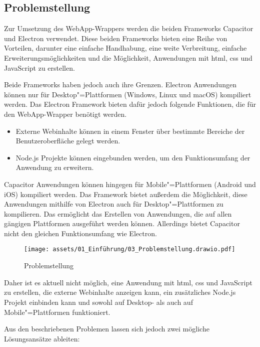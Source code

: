\subsection{Problemstellung}

Zur Umsetzung des WebApp-Wrappers werden die beiden Frameworks Capacitor und Electron verwendet.
Diese beiden Frameworks bieten eine Reihe von Vorteilen, darunter eine einfache Handhabung, eine weite Verbreitung, einfache Erweiterungsmöglichkeiten und die Möglichkeit, Anwendungen mit \ac{html}, \ac{css} und JavaScript zu erstellen.
\cite{capacitor:docs, electron:docs}

Beide Frameworks haben jedoch auch ihre Grenzen.
Electron Anwendungen können nur für Desktop"=Plattformen (Windows, Linux und macOS) kompiliert werden.
Das Electron Framework bieten dafür jedoch folgende Funktionen, die für den WebApp-Wrapper benötigt werden.
\cite{electron:docs}

\begin{itemize}
  \setlength\itemsep{-0.5em}
  \item Externe Webinhalte können in einem Fenster über bestimmte Bereiche der Benutzeroberfläche gelegt werden.
  \item Node.js Projekte können eingebunden werden, um den Funktionsumfang der Anwendung zu erweitern.
\end{itemize}

Capacitor Anwendungen können hingegen für Mobile"=Plattformen (Android und iOS) kompiliert werden.
Das Framework bietet außerdem die Möglichkeit, diese Anwendungen mithilfe von Electron auch für Desktop"=Plattformen zu kompilieren.
Das ermöglicht das Erstellen von Anwendungen, die auf allen gängigen Plattformen ausgeführt werden können.
Allerdings bietet Capacitor nicht den gleichen Funktionsumfang wie Electron.
\cite{capacitor:docs, capacitor-electron}

\begin{figure}[H]
  \centering
  \texttt{[image: assets/01\_Einführung/03\_Problemstellung.drawio.pdf]}
  \caption{Problemstellung}
\end{figure}

Daher ist es aktuell nicht möglich, eine Anwendung mit \ac{html}, \ac{css} und JavaScript zu erstellen, die externe Webinhalte anzeigen kann, ein zusätzliches Node.js Projekt einbinden kann und sowohl auf Desktop- als auch auf Mobile"=Plattformen funktioniert.

Aus den beschriebenen Problemen lassen sich jedoch zwei mögliche Lösungsansätze ableiten:

